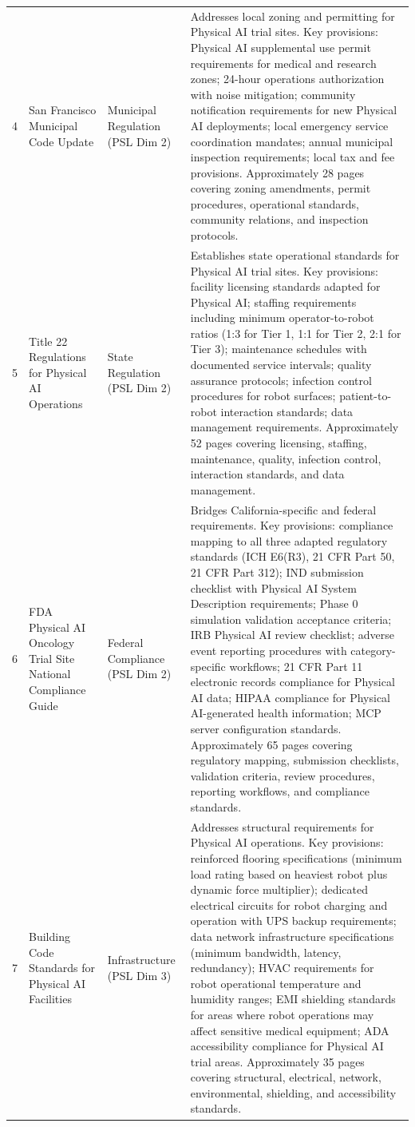 \begin{longtable}{c l l p{8cm}}
4 & San Francisco Municipal Code Update & Municipal Regulation (PSL Dim 2) & Addresses local zoning and permitting for Physical AI trial sites. Key provisions: Physical AI supplemental use permit requirements for medical and research zones; 24-hour operations authorization with noise mitigation; community notification requirements for new Physical AI deployments; local emergency service coordination mandates; annual municipal inspection requirements; local tax and fee provisions. Approximately 28 pages covering zoning amendments, permit procedures, operational standards, community relations, and inspection protocols. \\
5 & Title 22 Regulations for Physical AI Operations & State Regulation (PSL Dim 2) & Establishes state operational standards for Physical AI trial sites. Key provisions: facility licensing standards adapted for Physical AI; staffing requirements including minimum operator-to-robot ratios (1:3 for Tier 1, 1:1 for Tier 2, 2:1 for Tier 3); maintenance schedules with documented service intervals; quality assurance protocols; infection control procedures for robot surfaces; patient-to-robot interaction standards; data management requirements. Approximately 52 pages covering licensing, staffing, maintenance, quality, infection control, interaction standards, and data management. \\
6 & FDA Physical AI Oncology Trial Site National Compliance Guide & Federal Compliance (PSL Dim 2) & Bridges California-specific and federal requirements. Key provisions: compliance mapping to all three adapted regulatory standards (ICH E6(R3), 21 CFR Part 50, 21 CFR Part 312); IND submission checklist with Physical AI System Description requirements; Phase 0 simulation validation acceptance criteria; IRB Physical AI review checklist; adverse event reporting procedures with category-specific workflows; 21 CFR Part 11 electronic records compliance for Physical AI data; HIPAA compliance for Physical AI-generated health information; MCP server configuration standards. Approximately 65 pages covering regulatory mapping, submission checklists, validation criteria, review procedures, reporting workflows, and compliance standards. \\
7 & Building Code Standards for Physical AI Facilities & Infrastructure (PSL Dim 3) & Addresses structural requirements for Physical AI operations. Key provisions: reinforced flooring specifications (minimum load rating based on heaviest robot plus dynamic force multiplier); dedicated electrical circuits for robot charging and operation with UPS backup requirements; data network infrastructure specifications (minimum bandwidth, latency, redundancy); HVAC requirements for robot operational temperature and humidity ranges; EMI shielding standards for areas where robot operations may affect sensitive medical equipment; ADA accessibility compliance for Physical AI trial areas. Approximately 35 pages covering structural, electrical, network, environmental, shielding, and accessibility standards. \\

\end{longtable}
